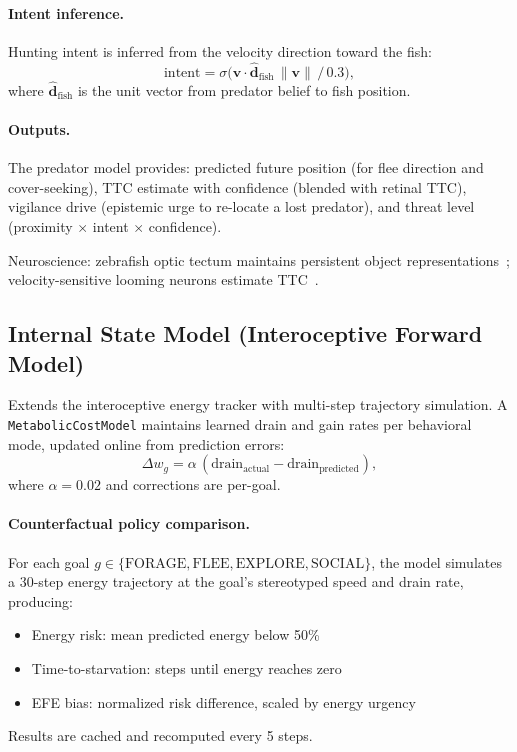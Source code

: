 \documentclass[11pt,a4paper]{article}
\begin{document}
\paragraph{Intent inference.}
Hunting intent is inferred from the velocity direction toward the fish:
\begin{equation}
  \text{intent} = \sigma\bigl(\mathbf{v} \cdot \hat{\mathbf{d}}_\text{fish}\,
  \|\mathbf{v}\|\, / \, 0.3\bigr),
\end{equation}
where $\hat{\mathbf{d}}_\text{fish}$ is the unit vector from predator
belief to fish position.

\paragraph{Outputs.}
The predator model provides: predicted future position (for flee
direction and cover-seeking), TTC estimate with confidence (blended
with retinal TTC), vigilance drive (epistemic urge to re-locate a
lost predator), and threat level (proximity $\times$ intent $\times$
confidence).

Neuroscience: zebrafish optic tectum maintains persistent object
representations~\cite{bianco2019}; velocity-sensitive looming neurons
estimate TTC~\cite{temizer2015}.

\subsection{Internal State Model (Interoceptive Forward Model)}

Extends the interoceptive energy tracker with multi-step trajectory
simulation.  A \texttt{MetabolicCostModel} maintains learned drain
and gain rates per behavioral mode, updated online from prediction
errors:
\begin{equation}\label{eq:metabolic_pe}
  \Delta w_g = \alpha\,(\text{drain}_\text{actual} - \text{drain}_\text{predicted}),
\end{equation}
where $\alpha = 0.02$ and corrections are per-goal.

\paragraph{Counterfactual policy comparison.}
For each goal $g \in \{\text{FORAGE}, \text{FLEE}, \text{EXPLORE},
\text{SOCIAL}\}$, the model simulates a 30-step energy trajectory
at the goal's stereotyped speed and drain rate, producing:
\begin{itemize}[nosep]
  \item Energy risk: mean predicted energy below 50\%
  \item Time-to-starvation: steps until energy reaches zero
  \item EFE bias: normalized risk difference, scaled by energy urgency
\end{itemize}
Results are cached and recomputed every 5 steps.
\end{document}
